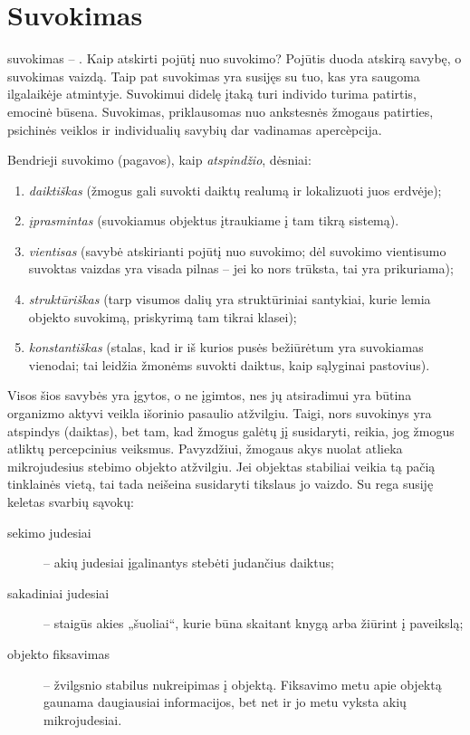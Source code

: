 \section{Suvokimas}

\label{tema:suvokimas}

\Gls{suvokimas} – . Kaip atskirti pojūtį nuo 
suvokimo? Pojūtis duoda atskirą savybę, o suvokimas vaizdą. Taip pat 
suvokimas yra susijęs su tuo, kas yra saugoma ilgalaikėje atmintyje.
Suvokimui didelę įtaką turi individo turima patirtis, emocinė būsena.
Suvokimas, priklausomas nuo ankstesnės žmogaus patirties, psichinės
veiklos ir individualių savybių dar vadinamas apercèpcija.

Bendrieji suvokimo (pagavos), kaip \emph{atspindžio}, dėsniai:
\begin{enumerate}
  \item \emph{daiktiškas} (žmogus gali suvokti daiktų realumą ir 
    lokalizuoti juos erdvėje);
  \item \emph{įprasmintas} (suvokiamus objektus įtraukiame į tam tikrą 
    sistemą).
  \item \emph{vientisas} (savybė atskirianti pojūtį nuo suvokimo; dėl
    suvokimo vientisumo suvoktas vaizdas yra visada pilnas – jei ko nors
    trūksta, tai yra prikuriama);
  \item \emph{struktūriškas} (tarp visumos dalių yra struktūriniai 
    santykiai, kurie lemia objekto suvokimą, priskyrimą tam tikrai klasei);
  \item \emph{konstantiškas} (stalas, kad ir iš kurios pusės bežiūrėtum
    yra suvokiamas vienodai; tai leidžia žmonėms suvokti daiktus, kaip 
    sąlyginai pastovius).
\end{enumerate}
Visos šios savybės yra įgytos, o ne įgimtos, nes jų atsiradimui yra
būtina organizmo aktyvi veikla išorinio pasaulio atžvilgiu. Taigi, nors
suvokinys yra atspindys (daiktas), bet tam, kad žmogus galėtų jį
susidaryti, reikia, jog žmogus atliktų percepcinius veiksmus. Pavyzdžiui,
žmogaus akys nuolat atlieka mikrojudesius stebimo objekto atžvilgiu.
Jei objektas stabiliai veikia tą pačią tinklainės vietą, tai tada 
neišeina susidaryti tikslaus jo vaizdo. Su rega susiję keletas svarbių 
sąvokų:
\begin{description}
  \item[sekimo judesiai] – akių judesiai įgalinantys stebėti judančius
    daiktus;
  \item[sakadiniai judesiai] – staigūs akies „šuoliai“, kurie būna skaitant
    knygą arba žiūrint į paveikslą;
  \item[objekto fiksavimas] – žvilgsnio stabilus nukreipimas į objektą.
    Fiksavimo metu apie objektą gaunama daugiausiai informacijos, bet
    net ir jo metu vyksta akių mikrojudesiai.
\end{description}

